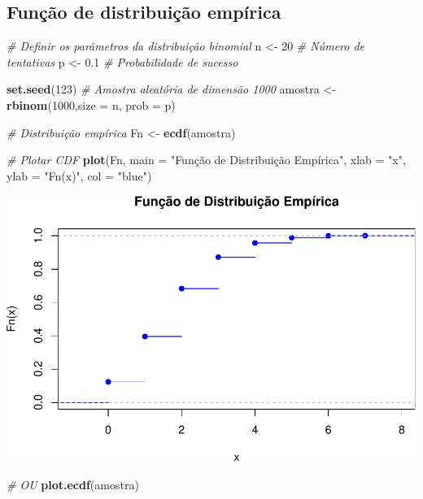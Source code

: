 \documentclass[
]{book}
\newenvironment{Shaded}{\begin{snugshade}}{\end{snugshade}}
\newcommand{\AttributeTok}[1]{\textcolor[rgb]{0.13,0.29,0.53}{#1}}
\newcommand{\CommentTok}[1]{\textcolor[rgb]{0.56,0.35,0.01}{\textit{#1}}}
\newcommand{\DecValTok}[1]{\textcolor[rgb]{0.00,0.00,0.81}{#1}}
\newcommand{\FloatTok}[1]{\textcolor[rgb]{0.00,0.00,0.81}{#1}}
\newcommand{\FunctionTok}[1]{\textcolor[rgb]{0.13,0.29,0.53}{\textbf{#1}}}
\newcommand{\NormalTok}[1]{#1}
\newcommand{\OtherTok}[1]{\textcolor[rgb]{0.56,0.35,0.01}{#1}}
\newcommand{\StringTok}[1]{\textcolor[rgb]{0.31,0.60,0.02}{#1}}
\begin{document}
\subsection{Função de distribuição empírica}\label{funuxe7uxe3o-de-distribuiuxe7uxe3o-empuxedrica}

\begin{Shaded}
\begin{Highlighting}[]
\CommentTok{\# Definir os parâmetros da distribuição binomial}
\NormalTok{n }\OtherTok{\textless{}{-}} \DecValTok{20} \CommentTok{\# Número de tentativas}
\NormalTok{p }\OtherTok{\textless{}{-}} \FloatTok{0.1} \CommentTok{\# Probabilidade de sucesso}

\FunctionTok{set.seed}\NormalTok{(}\DecValTok{123}\NormalTok{)}
\CommentTok{\# Amostra aleatória de dimensão 1000}
\NormalTok{amostra }\OtherTok{\textless{}{-}} \FunctionTok{rbinom}\NormalTok{(}\DecValTok{1000}\NormalTok{,}\AttributeTok{size =}\NormalTok{ n, }\AttributeTok{prob =}\NormalTok{ p)}

\CommentTok{\# Distribuição empírica }
\NormalTok{Fn }\OtherTok{\textless{}{-}} \FunctionTok{ecdf}\NormalTok{(amostra)}

\CommentTok{\# Plotar CDF}
\FunctionTok{plot}\NormalTok{(Fn, }\AttributeTok{main =} \StringTok{"Função de Distribuição Empírica"}\NormalTok{, }\AttributeTok{xlab =} \StringTok{"x"}\NormalTok{, }
\AttributeTok{ylab =} \StringTok{"Fn(x)"}\NormalTok{, }\AttributeTok{col =} \StringTok{"blue"}\NormalTok{)}
\end{Highlighting}
\end{Shaded}

\includegraphics{introR_files/figure-latex/unnamed-chunk-251-1.pdf}

\begin{Shaded}
\begin{Highlighting}[]
\CommentTok{\# OU}
\FunctionTok{plot.ecdf}\NormalTok{(amostra)}
\end{Highlighting}
\end{Shaded}
\end{document}
